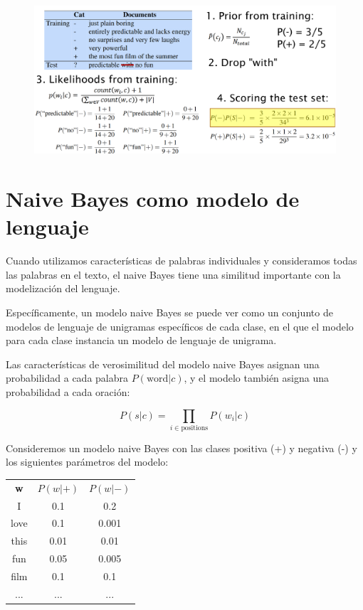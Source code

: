 \begin{figure}[h]
\includegraphics[scale = 0.23]{pics/naive_example.png}
\end{figure}

\section{Naive Bayes como modelo de lenguaje}

Cuando utilizamos características de palabras individuales y consideramos todas las palabras en el texto, el naive Bayes tiene una similitud importante con la modelización del lenguaje.

Específicamente, un modelo naive Bayes se puede ver como un conjunto de modelos de lenguaje de unigramas específicos de cada clase, en el que el modelo para cada clase instancia un modelo de lenguaje de unigrama.

Las características de verosimilitud del modelo naive Bayes asignan una probabilidad a cada palabra $P(\text{word}|c)$, y el modelo también asigna una probabilidad a cada oración:

\[P(s|c) = \prod_{i\in \text{positions}} P(w_i|c)\]

Consideremos un modelo naive Bayes con las clases positiva (+) y negativa (-) y los siguientes parámetros del modelo:

\begin{center}
\begin{tabular}{ccc}
\textbf{w} & $P(w|+)$ & $P(w|-)$ \\
I & 0.1 & 0.2 \\
love & 0.1 & 0.001 \\
this & 0.01 & 0.01 \\
fun & 0.05 & 0.005 \\
film & 0.1 & 0.1 \\
... & ... & ...
\end{tabular}
\end{center}

